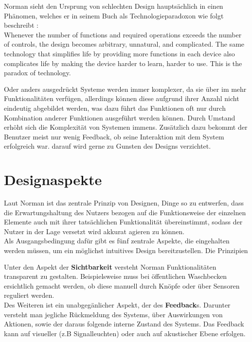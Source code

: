 \documentclass[parskip,headsepline, headtopline, %
footsepline, oneside, 12pt, headings=small]{scrreprt}
\begin{document}
Norman sieht den Ursprung von schlechten Design hauptsächlich in einen Phänomen, welches er in seinem Buch als Technologieparadoxon wie folgt beschreibt \cite[S.31]{don}:\\

\glqq Whenever the number of functions and required operations exceeds the number of controls, the design becomes arbitrary, unnatural, and complicated. 
	The same technology that simplifies life by providing more functions in each device also complicates life by making the device harder to learn, harder to use. This is the paradox of technology.\grqq 

Oder anders ausgedrückt Systeme werden immer komplexer, da sie über im mehr Funktionalitäten verfügen, allerdings können diese aufgrund ihrer Anzahl nicht eindeutig abgebildet werden, was dazu führt das Funktionen oft nur durch Kombination anderer Funktionen ausgeführt werden können. Durch Umstand erhöht sich die Komplexität von Systemen immens. Zusätzlich dazu bekommt der Benutzer meist nur wenig Feedback, ob seine Interaktion mit dem System erfolgreich war. darauf wird gerne zu Gunsten des Designs verzichtet. 


\section{Designaspekte}
\label{sec:aspekte}

Laut Norman ist das zentrale Prinzip von Designen, Dinge so zu entwerfen, dass die Erwartungshaltung des Nutzers bezogen auf die Funktionsweise der einzelnen Elemente auch mit ihrer tatsächlichen Funktionalität übereinstimmt, sodass der Nutzer in der Lage versetzt wird akkurat agieren zu können.\\ 
Als Ausgangsbedingung dafür gibt es fünf zentrale Aspekte, die eingehalten werden müssen, um  ein möglichst intuitives Design bereitzustellen. Die Prinzipien 
	
Unter den Aspekt der \textbf{Sichtbarkeit} versteht Norman Funktionalitäten transparent zu gestalten. Beispielsweise muss bei öffentlichen Waschbecken ersichtlich gemacht werden, ob diese manuell durch Knöpfe oder über Sensoren reguliert werden.\\
   
Des Weiteren ist ein unabgegänlicher Aspekt, der des \textbf{Feedback}s. Darunter versteht man jegliche Rückmeldung des Systems, über Auswirkungen von Aktionen, sowie der daraus folgende interne Zustand des Systems. Das Feedback kann auf visueller (z.B Signalleuchten) oder auch auf akustischer Ebene erfolgen.\\
 
\end{document}
